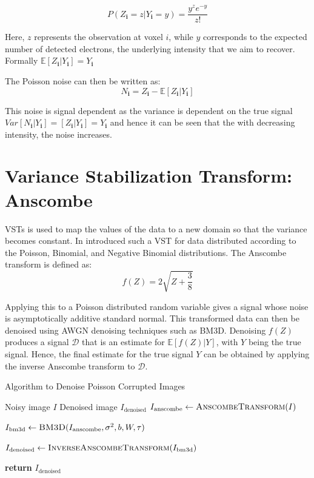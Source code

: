 \begin{equation}
    P(Z_{\mathbf{i}} = z| Y_{\mathbf{i}} = y) = \frac{y^z e^{-y}}{z!}
\end{equation}


Here, $z$ represents the observation at voxel $i$, while $y$ corresponds to the expected number of detected electrons, the underlying intensity that we aim to recover. Formally $\mathbb{E}[Z_{\mathbf{i}} | Y_{\mathbf{i}}] = Y_{\mathbf{i}}$

The Poisson noise can then be written as:
\begin{equation}
    N_{\mathbf{i}} = Z_{\mathbf{i}} - \mathbb{E}[Z_{\mathbf{i}} | Y_{\mathbf{i}}]
\end{equation}

This noise is signal dependent as the variance is dependent on the true signal $Var[N_{\mathbf{i}} | Y_{\mathbf{i}}] = [Z_{\mathbf{i}} | Y_{\mathbf{i}}] = Y_{\mathbf{i}}$ and hence it can be seen that the with decreasing intensity, the noise increases.

\section{Variance Stabilization Transform: Anscombe}
\Glspl{VST} is used to map the values of the data to a new domain so that the variance becomes constant. In \cite{anscombeTransformationPoissonBinomial1948} introduced such a \gls{VST} for data distributed according to the Poisson, Binomial, and Negative Binomial distributions. The Anscombe transform is defined as:
\begin{equation}
    f(Z) = 2 \sqrt{Z + \frac{3}{8}}
\end{equation}

Applying this to a Poisson distributed random variable gives a signal whose noise is asymptotically additive standard normal. This transformed data can then be denoised using \gls{AWGN} denoising techniques such as \gls{BM3D}. Denoising $f(Z)$ produces a signal $\mathcal{D}$ that is an estimate for $\mathbb{E}[f(Z) | Y]$, with $Y$ being the true signal. Hence, the final estimate for the true signal $Y$ can be obtained by applying the inverse Anscombe transform to $\mathcal{D}$.

\begin{algorithm}
    \caption{Algorithm to Denoise Poisson Corrupted Images}\label{alg:anscombe-bm3d}
    \begin{algorithmic}[1]
    \Require Noisy image $I$
    \Ensure Denoised image $I_{\text{denoised}}$
    \Statex
        \State $I_{\text{anscombe}} \gets \textsc{AnscombeTransform}(I)$
        
        \State $I_{\text{bm3d}} \gets \textsc{BM3D}(I_{\text{anscombe}}, \sigma^2, b, W, \tau)$
        
        \State $I_{\text{denoised}} \gets \textsc{InverseAnscombeTransform}(I_{\text{bm3d}})$
        
        \State \textbf{return} $I_{\text{denoised}}$
    \EndProcedure
    \end{algorithmic}
\end{algorithm}

